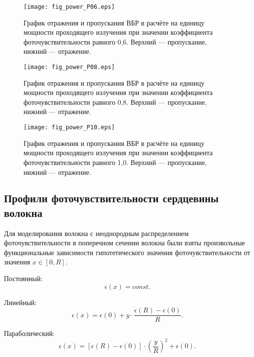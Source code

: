 \begin{figure}
  \centering
  \texttt{[image: fig\_power\_P06.eps]}\\
  \caption{График отражения и пропускания ВБР в расчёте на единицу мощности проходящего излучения при значении коэффициента фоточувствительности равного 0,6. Верхний --- пропускание, нижний --- отражение.}\label{figP8}
\end{figure}

\begin{figure}
  \centering
  \texttt{[image: fig\_power\_P08.eps]}\\
  \caption{График отражения и пропускания ВБР в расчёте на единицу мощности проходящего излучения при значении коэффициента фоточувствительности равного 0,8. Верхний --- пропускание, нижний --- отражение.}\label{figP9}
\end{figure}

\begin{figure}
  \centering
  \texttt{[image: fig\_power\_P10.eps]}\\
  \caption{График отражения и пропускания ВБР в расчёте на единицу мощности проходящего излучения при значении коэффициента фоточувствительности равного 1,0. Верхний --- пропускание, нижний --- отражение.}\label{figP10}
\end{figure}


\subsection{Профили фоточувствительности сердцевины волокна}

Для моделирования волокна с неоднородным распределением фоточувствительности в поперечном сечении волокна были взяты произвольные функциональные зависимости гипотетического значения фоточувствительности от значения $x \in [ 0,R ]$.

Постоянный:
\begin{equation} \label{eq2.1}
    \epsilon(x)=const.
\end{equation}

Линейный:
\begin{equation} \label{eq2.2}
    \epsilon(x)=\epsilon(0)+y \cdot\frac{\epsilon(R)-\epsilon(0)}{R}.
\end{equation}

Параболический:
\begin{equation} \label{eq2.3}
    \epsilon(x)=[\epsilon(R)-\epsilon(0)]\cdot\left(\frac{y}{R}\right)^2+\epsilon(0).
\end{equation}

